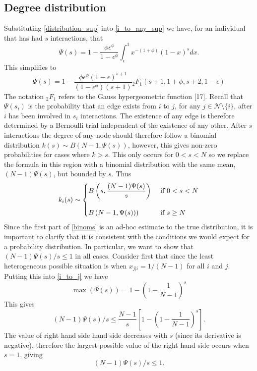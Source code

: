 \documentclass[twocolumn,8pt]{article}
\begin{document}
\subsection{Degree distribution}
\label{degree_distribution}
Substituting \eqref{distribution_sup} into \eqref{i_to_any_sup} we have, for an individual that has had $s$ interactions, that
\begin{equation}
\Psi(s)=1-\frac{\phi\epsilon^{\phi}}{1-\epsilon^{\phi}}\int_{\epsilon}^{1} x^{-(1+\phi)}(1-x)^{s}dx.
\end{equation}
This simplifies to
\begin{equation}
\label{hyper_solution_sup}
\Psi(s)=1-\frac{\phi\epsilon^{\phi}(1-\epsilon)^{s+1}}{(1-\epsilon^{\phi})(s+1)}{}_{2}F_{1}(s+1, 1+\phi, s+2, 1-\epsilon)
\end{equation}
The notation ${}_{2}F_{1}$ refers to the Gauss hypergeometric function [17]. Recall that $\Psi(s_{i})$ is the probability that an edge exists from $i$ to $j$, for any $j\in \mathcal{N}\setminus\{i\}$, after $i$ has been involved in $s_{i}$ interactions. The existence of any edge is therefore determined by a Bernoulli trial independent of the existence of any other. After $s$ interactions the degree of any node should therefore follow a binomial distribution $k(s)\sim B(N-1,\Psi(s))$, however, this gives non-zero probabilities for cases where $k>s$. This only occurs for $0<s<N$ so we replace the formula in this region with a binomial distribution with the same mean, $(N-1)\Psi(s)$, but bounded by $s$. Thus 
\begin{equation}
\label{binoms}
k_{i}(s) \sim
   \begin{dcases}
    B\left(s,\frac{(N-1)\Psi(s)}{s}\right) & \text{ if }0<s<N\\[10pt]
    B\left(N-1,\Psi(s))\right) & \text{ if } s \geq N
  \end{dcases}
\end{equation}
Since the first part of \eqref{binoms} is an ad-hoc estimate to the true distribution, it is important to clarify that it is consistent with the conditions we would expect for a probability distribution. In particular, we want to show that $(N-1)\Psi(s)/s\leq 1$ in all cases.
Consider first that since the least heterogeneous possible situation is when $x_{j|i}=1/(N-1)$ for all $i$ and $j$. Putting this into \eqref{i_to_j} we have
\begin{equation}
\max(\Psi(s))=1-\left(1-\frac{1}{N-1}\right)^{s}
\end{equation}
This gives
\begin{equation}
(N-1)\Psi(s)/s\leq \frac{N-1}{s}\left[1-\left(1-\frac{1}{N-1}\right)^{s}\right].
\end{equation}
The value of right hand side hand side decreases with $s$ (since its derivative is negative), therefore the largest possible value of the right hand side occurs when $s=1$, giving 
\begin{equation}
(N-1)\Psi(s)/s\leq 1.
\end{equation}
\end{document}
